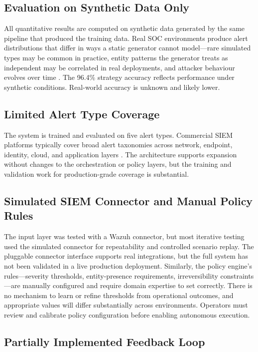 \subsection{Evaluation on Synthetic Data Only}

All quantitative results are computed on synthetic data generated by the same pipeline that produced the training data. Real SOC environments produce alert distributions that differ in ways a static generator cannot model---rare simulated types may be common in practice, entity patterns the generator treats as independent may be correlated in real deployments, and attacker behaviour evolves over time \cite{sommer2010outside}. The 96.4\% strategy accuracy reflects performance under synthetic conditions. Real-world accuracy is unknown and likely lower.

\subsection{Limited Alert Type Coverage}

The system is trained and evaluated on five alert types. Commercial SIEM platforms typically cover broad alert taxonomies across network, endpoint, identity, cloud, and application layers \cite{nist80092, tilbury2024humans}. The architecture supports expansion without changes to the orchestration or policy layers, but the training and validation work for production-grade coverage is substantial.

\subsection{Simulated SIEM Connector and Manual Policy Rules}

The input layer was tested with a Wazuh connector, but most iterative testing used the simulated connector for repeatability and controlled scenario replay. The pluggable connector interface supports real integrations, but the full system has not been validated in a live production deployment. Similarly, the policy engine's rules---severity thresholds, entity-presence requirements, irreversibility constraints---are manually configured and require domain expertise to set correctly. There is no mechanism to learn or refine thresholds from operational outcomes, and appropriate values will differ substantially across environments. Operators must review and calibrate policy configuration before enabling autonomous execution.

\subsection{Partially Implemented Feedback Loop}

